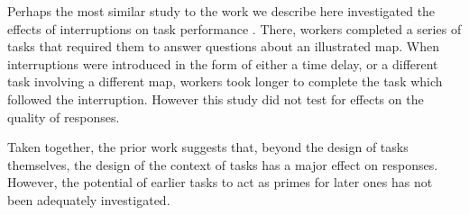\documentclass{sigchi}
\begin{document}
Perhaps the most similar study to the work we describe here 
investigated the effects of interruptions on task performance
\cite{laseckieffects}.  There, workers 
completed a series of tasks that required them to answer questions about
an illustrated map.  When interruptions were introduced
in the form of either a time delay, or a different task involving a
different map, workers took longer to complete the task which 
followed the interruption.  However this study did not test for
effects on the quality of responses.

Taken together, the prior work suggests that, beyond the design
of tasks themselves, the design of the context of tasks has a major
effect on responses.
However, the potential of earlier tasks to act as primes for later ones 
has not been adequately investigated.

%
%
%
\end{document}
